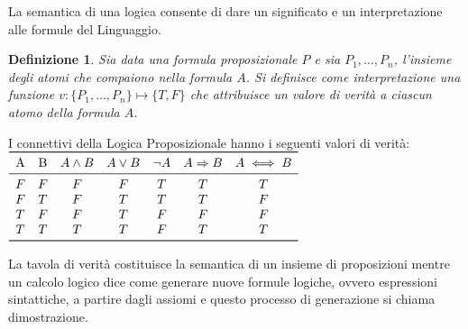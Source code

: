\documentclass[a4paper]{report}
\newtheorem{defi}{Definizione}%
\begin{document}
La semantica di una logica consente di dare un significato e un interpretazione alle formule del Linguaggio.\newline
\begin{defi}
  Sia data una formula proposizionale $P$ e sia ${P_1,\dots,P_n}$, l'insieme degli atomi che compaiono nella formula $A$.
  Si definisce come \emph{interpretazione} una funzione $v:\{P_1,\dots,P_n\} \mapsto \{T,F\}$ che attribuisce un valore di verità
  a ciascun atomo della formula $A$.
\end{defi}
I connettivi della Logica Proposizionale hanno i seguenti valori di verità:
$\begin{array}{ccccccc}
\toprule
\text{A} & \text{B} & A \land B & A \lor B & \neg A & A \Rightarrow B & A \iff B \\
\midrule
    F & F & F & F & T & T & T \\
    F & T & F & T & T & T & F \\
    T & F & F & T & F & F & F \\
    T & T & T & T & F & T & T \\
\bottomrule
\end{array}$

La tavola di verità costituisce la semantica di un insieme di proposizioni mentre un calcolo logico dice come generare nuove formule logiche,
ovvero espressioni sintattiche, a partire dagli assiomi e questo processo di generazione si chiama dimostrazione.
\end{document}
